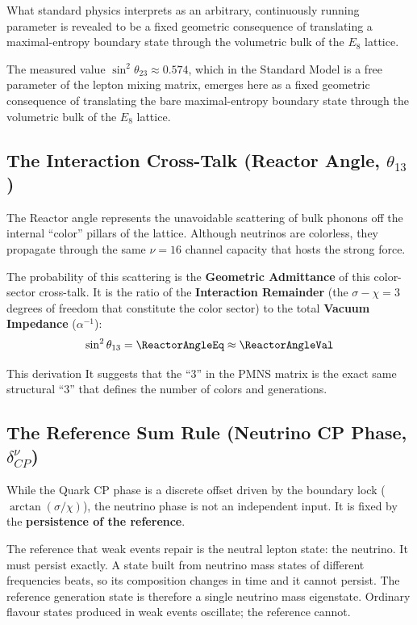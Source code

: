 What standard physics interprets as an arbitrary, continuously running parameter is revealed to be a fixed geometric consequence of translating a maximal-entropy boundary state through the volumetric bulk of the $E_8$ lattice.

The measured value $\sin^2 \theta_{23} \approx 0.574$, which in the Standard Model is a free parameter of the lepton mixing matrix, emerges here as a fixed geometric consequence of translating the bare maximal-entropy boundary state  through the volumetric bulk of the $E_8$ lattice.

\subsection{The Interaction Cross-Talk (Reactor Angle, \texorpdfstring{$\theta_{13}$}{theta 13})}

The Reactor angle represents the unavoidable scattering of bulk phonons off the internal ``color'' pillars of the lattice. Although neutrinos are colorless, they propagate through the same $\nu=16$ channel capacity that hosts the strong force. 

The probability of this scattering is the \textbf{Geometric Admittance} of this color-sector cross-talk. It is the ratio of the \textbf{Interaction Remainder} (the $\sigma-\chi=3$ degrees of freedom that constitute the color sector) to the total \textbf{Vacuum Impedance} ($\alpha^{-1}$):
\begin{equation}
    \sin^2 \theta_{13} = \ReactorAngleEq \approx \mathbf{\ReactorAngleVal}
\end{equation}

This derivation \ReactorAngleAccText It suggests that the ``3'' in the PMNS matrix is the exact same structural ``3'' that defines the number of colors and generations.

\subsection{The Reference Sum Rule (Neutrino CP Phase, \texorpdfstring{$\delta_{CP}^\nu$}{delta cpnu})}

While the Quark CP phase is a discrete offset driven by the boundary lock ($\arctan(\sigma/\chi)$), the neutrino phase is not an independent input. It is fixed by the \textbf{persistence of the reference}.

The reference that weak events repair is the neutral lepton state: the neutrino. It must persist exactly. A state built from neutrino mass states of different frequencies beats, so its composition changes in time and it cannot persist. The reference generation state is therefore a single neutrino mass eigenstate. Ordinary flavour states produced in weak events oscillate; the reference cannot.

